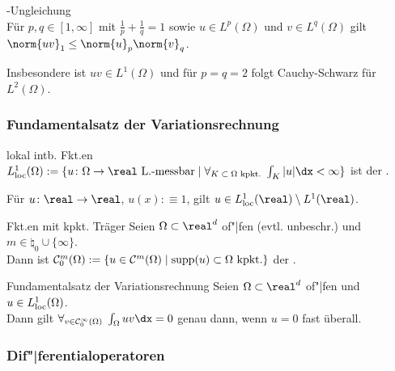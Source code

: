 \begin{Satz}{-Ungleichung}\\
    Für $p, q \in [1, \infty]$ mit $\frac{1}{p} + \frac{1}{q} = 1$ sowie
    $u \in L^p(\Omega)$ und $v \in L^q(\Omega)$ gilt $\norm{uv}_1 \le \norm{u}_p \norm{v}_q$.
\end{Satz}

\begin{Bem}
    Insbesondere ist $uv \in L^1(\Omega)$ und für $p = q = 2$ folgt Cauchy-Schwarz
    für $L^2(\Omega)$.
\end{Bem}

\subsubsection{%
    Fundamentalsatz der Variationsrechnung%
}

\begin{Def}{lokal intb. Fkt.en}
    $L^1_\loc(\Omega) := \{\text{$u\colon \Omega \to \real$ L.-messbar} \;|\;
    \forall_{\text{$K \subset \Omega$ kpkt.}}\; \int_K |u|\dx < \infty\}$
    ist der .
\end{Def}

\begin{Bsp}
    Für $u\colon \real \to \real$, $u(x) :\equiv 1$, gilt
    $u \in L^1_\loc(\real) \setminus L^1(\real)$.
\end{Bsp}

\linie

\begin{Def}{Fkt.en mit kpkt. Träger}
    Seien $\Omega \subset \real^d$ of"|fen (evtl. unbeschr.) und
    $m \in \natural_0 \cup \{\infty\}$.\\
    Dann ist
    $\mathcal{C}^m_0(\Omega) := \{u \in \mathcal{C}^m(\Omega) \;|\; \text{$\operatorname{supp}(u) \subset \Omega$ kpkt.}\}$
    der .
\end{Def}

\begin{Satz}{Fundamentalsatz der Variationsrechnung}
    Seien $\Omega \subset \real^d$ of"|fen und $u \in L^1_{\text{loc}}(\Omega)$.\\
    Dann gilt $\forall_{v \in \C^\infty_0(\Omega)}\; \int_\Omega uv \dx = 0$ genau dann, wenn
    $u = 0$ fast überall.
\end{Satz}

\pagebreak

\subsubsection{%
    Dif"|ferentialoperatoren%
}

